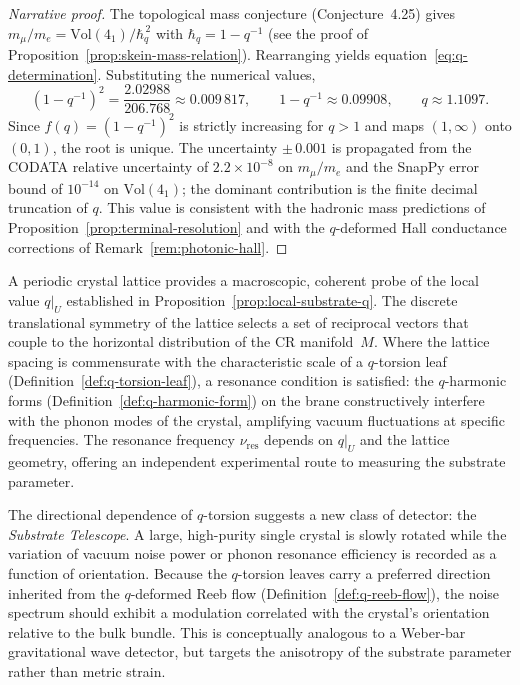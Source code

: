 \begin{proof}[Narrative proof]
The topological mass conjecture (Conjecture~4.25) gives
$m_\mu / m_e = \mathrm{Vol}(4_1) / \hbar_q^{\,2}$ with
$\hbar_q = 1 - q^{-1}$ (see the proof of
Proposition~\ref{prop:skein-mass-relation}).  Rearranging yields
equation~\eqref{eq:q-determination}.  Substituting the numerical values,
\[
  (1 - q^{-1})^{2}
  = \frac{2.02988}{206.768}
  \approx 0.009\,817,
  \qquad
  1 - q^{-1} \approx 0.09908,
  \qquad
  q \approx 1.1097.
\]
Since $f(q) = (1 - q^{-1})^{2}$ is strictly increasing for $q > 1$ and maps
$(1,\infty)$ onto $(0,1)$, the root is unique.  The uncertainty
$\pm\,0.001$ is propagated from the CODATA relative uncertainty of
$2.2 \times 10^{-8}$ on $m_\mu / m_e$ and the SnapPy error bound of
$10^{-14}$ on $\mathrm{Vol}(4_1)$; the dominant contribution is the
finite decimal truncation of $q$.  This value is consistent with the
hadronic mass predictions of Proposition~\ref{prop:terminal-resolution} and
with the $q$-deformed Hall conductance corrections of
Remark~\ref{rem:photonic-hall}.
\end{proof}

\begin{remark}
\label{rem:crystal-probe-q}
A periodic crystal lattice provides a macroscopic, coherent probe of the
local value $q|_U$ established in
Proposition~\ref{prop:local-substrate-q}.  The discrete translational
symmetry of the lattice selects a set of reciprocal vectors that couple to
the horizontal distribution of the CR manifold~$M$.  Where the lattice
spacing is commensurate with the characteristic scale of a $q$-torsion leaf
(Definition~\ref{def:q-torsion-leaf}), a resonance condition is satisfied:
the $q$-harmonic forms (Definition~\ref{def:q-harmonic-form}) on the brane
constructively interfere with the phonon modes of the crystal, amplifying
vacuum fluctuations at specific frequencies.  The resonance frequency
$\nu_{\mathrm{res}}$ depends on $q|_U$ and the lattice geometry, offering
an independent experimental route to measuring the substrate parameter.
\end{remark}

\begin{remark}
\label{rem:substrate-telescope}
The directional dependence of $q$-torsion suggests a new class of detector:
the \emph{Substrate Telescope}.  A large, high-purity single crystal is
slowly rotated while the variation of vacuum noise power or phonon resonance
efficiency is recorded as a function of orientation.  Because the $q$-torsion
leaves carry a preferred direction inherited from the $q$-deformed Reeb flow
(Definition~\ref{def:q-reeb-flow}), the noise spectrum should exhibit a
modulation correlated with the crystal's orientation relative to the bulk
bundle.  This is conceptually analogous to a Weber-bar gravitational wave
detector, but targets the anisotropy of the substrate parameter rather than
metric strain.
\end{remark}

